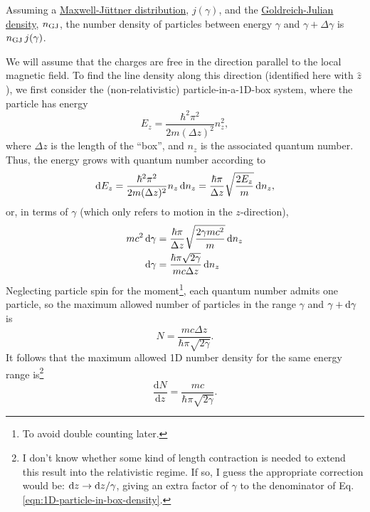 \documentclass{book}
\newcommand{\deriv}[2]{\frac{\text{d}{#1}}{\text{d}{#2}}}
\newcommand{\nGJ}{n_{\rm GJ}}
\begin{document}
Assuming a \hyperref[sec:maxwell-juttner-distribution]{Maxwell-J\"uttner distribution}, $j(\gamma)$, and the \hyperref[sec:GJ-charge-density]{Goldreich-Julian density}, $\nGJ$, the number density of particles between energy $\gamma$ and $\gamma + \Delta\gamma$ is $\nGJ \, j(\gamma)$.

We will assume that the charges are free in the direction parallel to the local magnetic field.
To find the line density along this direction (identified here with $\hat{z}$), we first consider the (non-relativistic) particle-in-a-1D-box system, where the particle has energy
\begin{equation}
  E_z = \frac{\hbar^2\pi^2}{2m(\Delta z)^2}n_z^2,
\end{equation}
where $\Delta z$ is the length of the ``box'', and $n_z$ is the associated quantum number.
Thus, the energy grows with quantum number according to
\begin{equation}
  {\rm d}E_z
    = \frac{\hbar^2\pi^2}{2m(\Delta z)^2} n_z \, {\rm d}n_z
    = \frac{\hbar\pi}{\Delta z}\sqrt{\frac{2E_z}{m}} \, {\rm d}n_z,
\end{equation}
or, in terms of $\gamma$ (which only refers to motion in the $z$-direction),
\begin{equation}
  \begin{aligned}
    mc^2\,{\rm d}\gamma &= \frac{\hbar\pi}{\Delta z}\sqrt{\frac{2\gamma mc^2}{m}} \, {\rm d}n_z \\
    {\rm d}\gamma &= \frac{\hbar\pi\sqrt{2\gamma}}{mc\Delta z} \, {\rm d}n_z
  \end{aligned}
\end{equation}
Neglecting particle spin for the moment\footnote{To avoid double counting later.}, each quantum number admits one particle, so the maximum allowed number of particles in the range $\gamma$ and $\gamma + {\rm d}\gamma$ is
\begin{equation}
  N = \frac{mc\Delta z}{\hbar\pi\sqrt{2\gamma}}.
\end{equation}
It follows that the maximum allowed 1D number density for the same energy range is\footnote{I don't know whether some kind of length contraction is needed to extend this result into the relativistic regime. If so, I guess the appropriate correction would be: ${\rm d}z \rightarrow {\rm d}z/\gamma$, giving an extra factor of $\gamma$ to the denominator of Eq. \eqref{eqn:1D-particle-in-box-density}.}
\begin{equation}
  \deriv{N}{z} = \frac{mc}{\hbar\pi\sqrt{2\gamma}}.
  \label{eqn:1D-particle-in-box-density}
\end{equation}
\end{document}
